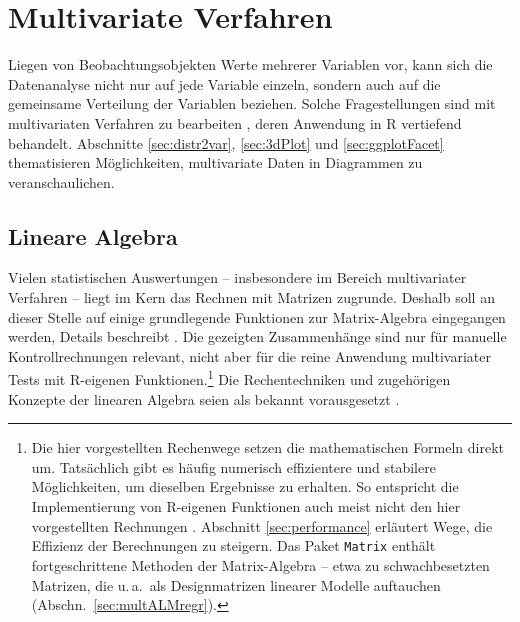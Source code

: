 \chapter{Multivariate Verfahren}
\label{sec:multivariate}

Liegen von Beobachtungsobjekten Werte mehrerer Variablen vor, kann sich die Datenanalyse nicht nur auf jede Variable einzeln, sondern auch auf die gemeinsame Verteilung der Variablen beziehen. Solche Fragestellungen sind mit multivariaten Verfahren zu bearbeiten \cite{Backhaus2008, Backhaus2013, Mardia1980}, deren Anwendung in R  vertiefend behandelt. Abschnitte \ref{sec:distr2var}, \ref{sec:3dPlot} und \ref{sec:ggplotFacet} thematisieren Möglichkeiten, multivariate Daten in Diagrammen zu veranschaulichen.

\section{Lineare Algebra}
\label{sec:linAlg}

Vielen statistischen Auswertungen -- insbesondere im Bereich multivariater Verfahren -- liegt im Kern das Rechnen mit Matrizen zugrunde. Deshalb soll an dieser Stelle auf einige grundlegende Funktionen zur Matrix-Algebra eingegangen werden, Details beschreibt . Die gezeigten Zusammenhänge sind nur für manuelle Kontrollrechnungen relevant, nicht aber für die reine Anwendung multivariater Tests mit R-eigenen Funktionen.\footnote{Die hier vorgestellten Rechenwege setzen die mathematischen Formeln direkt um. Tatsächlich gibt es häufig numerisch effizientere und stabilere Möglichkeiten, um dieselben Ergebnisse zu erhalten. So entspricht die Implementierung von R-eigenen Funktionen auch meist nicht den hier vorgestellten Rechnungen \cite{Bates2004}. Abschnitt \ref{sec:performance} erläutert Wege, die Effizienz der Berechnungen zu steigern. Das Paket \lstinline!Matrix! \cite{Bates2009} enthält fortgeschrittene Methoden der Matrix-Algebra -- etwa zu schwachbesetzten Matrizen, die u.\,a.\ als Designmatrizen linearer Modelle auftauchen (Abschn.\ \ref{sec:multALMregr}).} Die Rechentechniken und zugehörigen Konzepte der linearen Algebra seien als bekannt vorausgesetzt \cite{Fischer2008, Strang2003}.

